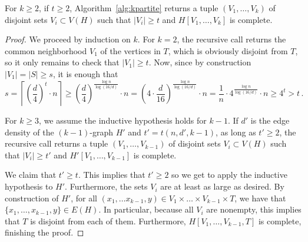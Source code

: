 \begin{theorem}
    For $k \geq 2$, if $t \geq 2$, Algorithm~\ref{alg:kpartite} returns a tuple $(V_1, \dots, V_k)$ of disjoint sets $V_i \subset V(H)$ such that
    $|V_i| \geq t$ and $H[V_1, \dots, V_k]$ is complete.

    \begin{proof}
        We proceed by induction on $k$.
        For $k=2$, the recursive call returns the common neighborhood $V_1$ of the vertices in $T$,
        which is obviously disjoint from $T$, so it only remains to check that $|V_1| \geq t$.
        Now, since by construction $|V_1| = |S| \geq s$, it is enough that
        \[
            s
            = \left\lceil \left( \frac{d}{4} \right)^t \cdot n \right\rceil
            \geq \left( \frac{d}{4} \right)^{\frac{\log n}{\log(16/d)}}  \cdot n
            = \left( 4 \cdot \frac{d}{16} \right)^{\frac{\log n}{\log(16/d)}} \cdot n
            = \frac{1}{n} \cdot 4^{\frac{\log n}{\log(16/d)}} \cdot n
            \geq 4^t
            > t\,.
        \]

        For $k \geq 3$, we assume the inductive hypothesis holds for $k-1$.
        If $d'$ is the edge density of the $(k-1)$-graph $H'$
        and $t' = t(n, d', k-1)$, as long as $t' \geq 2$, the recursive call returns
        a tuple $(V_1, \dots, V_{k-1})$ of disjoint sets $V_i \subset V(H)$ such that
        $|V_i| \geq t'$ and $H'[V_1, \dots, V_{k-1}]$ is complete.

        We claim that $t' \geq t$.
        This implies that $t' \geq 2$ so we get to apply the inductive hypothesis to $H'$.
        Furthermore, the sets $V_i$ are at least as large as desired.
        By construction of $H'$, for all $(x_1, \dots x_{k-1}, y) \in V_1 \times \dots \times V_{k-1} \times T$,
        we have that $\{x_1, \dots, x_{k-1}, y\} \in E(H)$.
        In particular, because all $V_i$ are nonempty, this implies that $T$ is disjoint from each of them.
        Furthermore, $H[V_1, \dots, V_{k-1}, T]$ is complete, finishing the proof.


\end{proof}
\end{theorem}
